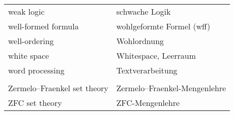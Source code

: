 \begin{longtabu}   { @{} X[l] X[l] }
    weak logic & schwache Logik \\
    well-formed formula & wohlgeformte Formel (wff) \\
    well-ordering & Wohlordnung \\
    white space & Whitespace, Leerraum \\
    word processing & Textverarbeitung \\
     & \\
    Zermelo--Fraenkel set theory & Zermelo--Fraenkel-{\allowbreak}Mengenlehre \\
    ZFC set theory & ZFC-Mengenlehre \\
\end{longtabu}

%
%
%
%
%

\cleardoublepage
{}  %


%

\raggedright
\cleardoublepage
{} %




